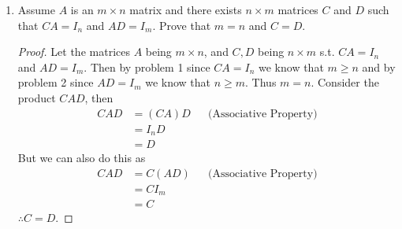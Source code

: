 \documentclass[12pt]{article}
\begin{document}
\begin{enumerate}
        \item Assume $A$ is an $m \times n$ matrix and there exists $n \times m$ matrices $C$ and $D$ such that
        $CA=I_n$ and $AD=I_m$. Prove that $m=n$ and $C=D$.
        \begin{proof}
            Let the matrices $A$ being $m \times n$, and $C,D$ being $n \times m$ s.t. $CA=I_n$ and 
            $AD=I_m$. Then by problem 1 since $CA=I_n$ we know that $m \geq n$ and by problem 2 
            since $AD=I_m$ we know that $n \geq m$. Thus $m=n$. Consider the product $CAD$, then
            \begin{align*}
                CAD &= (CA)D && \text{(Associative Property)} \\
                &=I_{n}D \\
                &=D
            \end{align*} But we can also do this as
            \begin{align*}
                CAD &= C(AD) && \text{(Associative Property)} \\
                &=CI_m \\
                &=C
            \end{align*}
            $\therefore C=D$.
        \end{proof}
    \end{enumerate}
\end{document}
